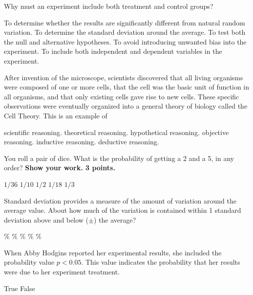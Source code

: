 
\question
Why must an experiment include both treatment and control groups?

\begin{choices}
\correctchoice To determine whether the results are significantly different from natural random variation.
\choice To determine the standard deviation around the average.
\choice To test both the null and alternative hypotheses.
\choice To avoid introducing unwanted bias into the experiment.
\choice To include both independent and dependent variables in the experiment.
\end{choices}

\question
After invention of the microscope, scientists discovered that all living organisms were composed of one or more cells, that the cell was the basic unit of function in all organisms, and that only existing cells gave rise to new cells. These specific observations were eventually organized into a general theory of biology called the Cell Theory. This is an example of 

\begin{choices}
\choice scientific reasoning.
\choice theoretical reasoning.
\choice hypothetical reasoning.
\choice objective reasoning.
\correctchoice inductive reasoning.
\choice deductive reasoning.
\end{choices}

\question
You roll a pair of dice.  What is the probability of getting a 2 and a 5, in any order? \textbf{Show your work.  3 points.}

\begin{choices}
\choice $1/36$
\choice $1/10$
\choice $1/2$
\correctchoice $1/18$
\choice $1/3$
\end{choices}

\question
Standard deviation provides a measure of the amount of variation around the average value. About how much of the variation is contained within 1 standard deviation above and below ($\pm$) the average?

\begin{choices}
\%
\%
\%
\%
\%
\end{choices}

\question
When Abby Hodgins reported her experimental results, she included the probability value  $p < 0.05$.  This value indicates the probability that her results were due to her experiment treatment.

\begin{choices}
\choice True%
\correctchoice False%
\end{choices}

